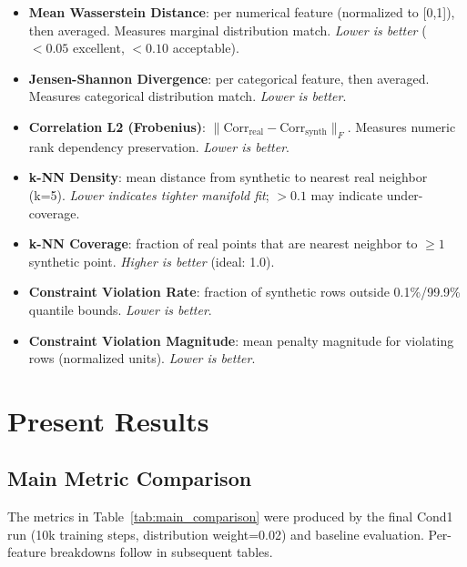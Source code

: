 \documentclass{article}
\begin{document}
\begin{itemize}
  \item \textbf{Mean Wasserstein Distance}: per numerical feature (normalized to [0,1]), then averaged. Measures marginal distribution match. \textit{Lower is better} ($<0.05$ excellent, $<0.10$ acceptable).
  
  \item \textbf{Jensen-Shannon Divergence}: per categorical feature, then averaged. Measures categorical distribution match. \textit{Lower is better}.
  
  \item \textbf{Correlation L2 (Frobenius)}: $\|\text{Corr}_{\text{real}} - \text{Corr}_{\text{synth}}\|_F$. Measures numeric rank dependency preservation. \textit{Lower is better}.
  
  \item \textbf{k-NN Density}: mean distance from synthetic to nearest real neighbor (k=5). \textit{Lower indicates tighter manifold fit}; $>0.1$ may indicate under-coverage.
  
  \item \textbf{k-NN Coverage}: fraction of real points that are nearest neighbor to $\geq 1$ synthetic point. \textit{Higher is better} (ideal: 1.0).
  
  \item \textbf{Constraint Violation Rate}: fraction of synthetic rows outside 0.1\%/99.9\% quantile bounds. \textit{Lower is better}.
  
  \item \textbf{Constraint Violation Magnitude}: mean penalty magnitude for violating rows (normalized units). \textit{Lower is better}.
\end{itemize}

\section{Present Results}

\subsection{Main Metric Comparison}

The metrics in Table~\ref{tab:main_comparison} were produced by the final Cond1 run (10k training steps, distribution weight=0.02) and baseline evaluation. Per-feature breakdowns follow in subsequent tables.
\end{document}
